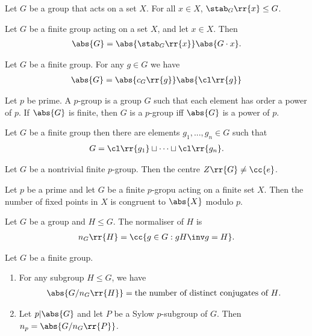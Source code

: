 \documentclass{article}
\begin{document}
\begin{lemma}
  Let $G$ be a group that acts on a set $X$. For all $x\in X$, $\stab_G\rr{x}\leq G$.
\end{lemma}

\begin{theorem}
  Let $G$ be a finite group acting on a set $X$, and let $x\in X$. Then
  \begin{align*}
    \abs{G}=\abs{\stab_G\rr{x}}\abs{G\cdot x}.
  \end{align*}
\end{theorem}

\begin{lemma}
  Let $G$ be a finite group. For any $g\in G$ we have
  \begin{align*}
    \abs{G}=\abs{c_G\rr{g}}\abs{\cl\rr{g}}
  \end{align*}
\end{lemma}

\begin{definition}
  \label{def:p-group}
  Let $p$ be prime. A $p$-group is a group $G$ such that each element has order a power of $p$.
  If $\abs{G}$ is finite, then $G$ is a $p$-group iff $\abs{G}$ is a power of $p$.
\end{definition}

\begin{theorem}
  Let $G$ be a finite group then there are elements $g_1,...,g_n\in G$ such that
  \begin{align*}
    G = \cl\rr{g_1}\sqcup\cdots\sqcup\cl\rr{g_n}.
  \end{align*}
\end{theorem}

\begin{theorem}
  Let $G$ be a nontrivial finite $p$-group. Then the centre $Z\rr{G}\neq \cc{e}$.
\end{theorem}

\begin{lemma}
  Let $p$ be a prime and let $G$ be a finite $p$-gropu acting on a finite set $X$. Then the
  number of fixed points in $X$ is congruent to $\abs{X}$ modulo $p$.
\end{lemma}

\begin{definition}
  \label{def:normaliser}
  Let $G$ be a group and $H\leq G$. The normaliser of $H$ is
  \begin{align*}
    n_G\rr{H}=\cc{g\in G : gH\inv g = H}.
  \end{align*}
\end{definition}

\begin{lemma}
  Let $G$ be a finite group.
  \begin{enumerate}
    \item For any subgroup $H\leq G$, we have
      \begin{align*}
        \abs{G/n_G\rr{H}}=\text{the number of distinct conjugates of $H$}.
      \end{align*}
    \item Let $p\vert \abs{G}$ and let $P$ be a Sylow $p$-subgroup of $G$. Then $n_p=\abs{G/n_G\rr{P}}$.
  \end{enumerate}
\end{lemma}
\end{document}
